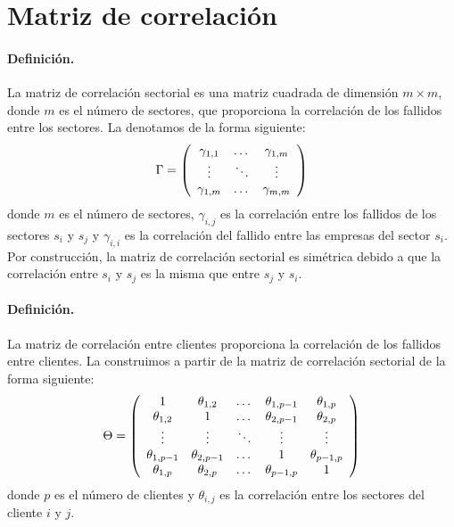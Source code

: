\section{Matriz de correlaci\'on}
\label{sec:mcorrel}

\paragraph{Definici\'on.} La matriz de correlaci\'on sectorial es una matriz
cuadrada de dimensi\'on $m \times m$, donde $m$ es el n\'umero de sectores, 
que proporciona la correlaci\'on de los fallidos entre los sectores. 
La denotamos de la forma siguiente:
\begin{displaymath}
\Gamma = \left(
\begin{array}{ccc}
\gamma_{1,1} & \dots  & \gamma_{1,m} \cr
\vdots & \ddots & \vdots \cr
\gamma_{1,m} & \dots  & \gamma_{m,m} 
\end{array}
\right)
\end{displaymath}
donde $m$ es el n\'umero de sectores, $\gamma_{i,j}$ es la correlaci\'on entre 
los fallidos de los sectores $s_i$ y $s_j$ y $\gamma_{i,i}$ es la correlaci\'on del 
fallido entre las empresas del sector $s_i$. Por construcci\'on, la matriz de 
correlaci\'on sectorial es sim\'etrica debido a que la correlaci\'on entre $s_i$
y $s_j$ es la misma que entre $s_j$ y $s_i$.

\paragraph{Definici\'on.} La matriz de correlaci\'on entre clientes proporciona
la correlaci\'on de los fallidos entre clientes. La construimos a partir de la
matriz de correlaci\'on sectorial de la forma siguiente:
\begin{displaymath}
\Theta = \left(
\begin{array}{ccccc}
1              & \theta_{1,2}   & \dots      & \theta_{1,p-1} & \theta_{1,p}   \cr
\theta_{1,2}   & 1              & \dots      & \theta_{2,p-1} & \theta_{2,p}   \cr
\vdots         & \vdots         & \ddots     & \vdots         & \vdots         \cr
\theta_{1,p-1} & \theta_{2,p-1} & \dots      & 1              & \theta_{p-1,p} \cr
\theta_{1,p}   & \theta_{2,p}   & \dots      & \theta_{p-1,p} & 1
\end{array}
\right)
\end{displaymath}
donde $p$ es el n\'umero de clientes y $\theta_{i,j}$ es la correlaci\'on entre
los sectores del cliente $i$ y $j$.

